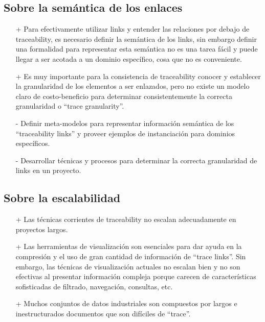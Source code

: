\documentclass[a4paper,12pt,oneside]{book}
\begin{document}
\subsection{Sobre la semántica de los enlaces}

\begin{itemize}
\item[+]     Para efectivamente utilizar links y entender las relaciones por debajo de traceability, es necesario definir la semántica de los links, sin embargo definir una formalidad para representar esta semántica no es una tarea fácil y puede llegar a ser acotada a un dominio específico, cosa que no es conveniente.
\item[+]    Es muy importante para la consistencia de traceability conocer y establecer la granularidad de los elementos a ser enlazados, pero no existe un modelo claro de costo-beneficio para determinar consistentemente la correcta granularidad o “trace granularity”.
\end{itemize}

\begin{itemize}
\item[-]     Definir meta-modelos para representar información semántica de los “traceability links” y proveer ejemplos de instanciación para dominios específicos.
\item[-]    Desarrollar técnicas y procesos para determinar la correcta granularidad de links en un proyecto.
\end{itemize}

\subsection{Sobre la escalabilidad}

\begin{itemize}
\item[+]     Las técnicas corrientes de traceability no escalan adecuadamente en proyectos largos.
\item[+]    Las herramientas de visualización son esenciales para dar ayuda en la compresión y el uso de gran cantidad de información de ``trace links''. Sin embargo, las técnicas de visualización actuales no escalan bien y no son efectivas al presentar información compleja porque carecen de características sofisticadas de filtrado, navegación, consultas, etc.
\item[+]    Muchos conjuntos de datos industriales son compuestos por largos e inestructurados documentos que son difíciles de “trace”.
\end{itemize}
\end{document}
